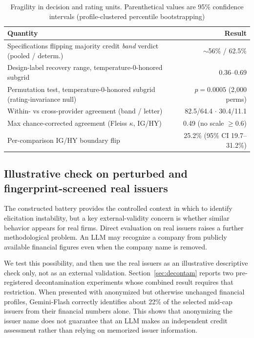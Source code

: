 \documentclass[a4paper,fleqn]{cas-sc}
\begin{document}
\begin{table}[t]\centering
\caption{Fragility in decision and rating units. Parenthetical values are 95\% confidence intervals
(profile-clustered percentile bootstrapping)}\label{tab:frag}
\begin{tabular}{lr}\toprule
Quantity & Result \\\midrule
Specifications flipping majority credit \emph{band} verdict (pooled / determ.) & $\sim$56\% / 62.5\% \\
Design-label recovery range, temperature-0-honored subgrid & 0.36--0.69 \\
Permutation test, temperature-0-honored subgrid (rating-invariance null) & $p=0.0005$ (2{,}000 perms) \\
Within- vs cross-provider agreement (band / letter) & 82.5/64.4 $\cdot$ 30.4/11.1 \\
Max chance-corrected agreement (Fleiss $\kappa$, IG/HY) & 0.49 (no scale $\geq0.6$) \\
Per-comparison IG/HY boundary flip & 25.2\% (95\% CI 19.7--31.2\%) \\\bottomrule
\end{tabular}\end{table}

\subsection{Illustrative check on perturbed and fingerprint-screened real issuers}\label{sec:realarm}
The constructed battery provides the controlled context in which to identify elicitation instability, but
a key external-validity concern is whether similar behavior appears for real firms. Direct evaluation on
real issuers raises a further methodological problem. An LLM may recognize a company from publicly
available financial figures even when the company name is removed.

We test this possibility, and then use the real issuers as an illustrative descriptive
check only, not as an external validation. Section~\ref{sec:decontam} reports two pre-registered
decontamination experiments whose combined result requires that restriction. When presented with
anonymized but otherwise unchanged financial profiles, Gemini-Flash correctly identifies about 22\% of
the selected mid-cap issuers from their financial numbers alone. This shows that anonymizing the issuer
name does not guarantee that an LLM makes an independent credit assessment rather than relying on
memorized issuer information.
\end{document}

